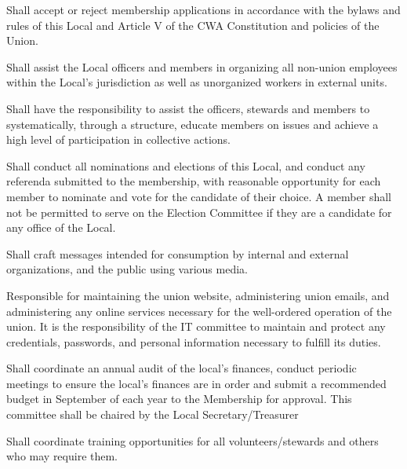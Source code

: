 \documentclass[12pt]{article}
\begin{document}
\begin{description}[labelwidth=\linewidth, listparindent=0pt]
\item[Membership Committee]
Shall accept or reject membership applications in accordance with the bylaws and rules of this Local and Article V of the CWA Constitution and policies of the Union.

\item[Organizing Committee]
Shall assist the Local officers and members in organizing all non-union employees within the Local's jurisdiction as well as unorganized workers in external units.
\item[Mobilization Committee]
Shall have the responsibility to assist the officers, stewards and members to systematically, through a structure, educate members on issues and achieve a high level of participation in collective actions.

\item[Election Committee]
Shall conduct all nominations and elections of this Local, and conduct any referenda submitted to the membership,  with reasonable opportunity for each member to nominate and vote for the candidate of their choice. A member shall not be permitted to serve on the Election Committee if they are a candidate for any office of the Local.

\item[Communications Committee]
  Shall craft messages intended for consumption by internal and external organizations, and the public using various media.

\item[IT Committee]
Responsible for maintaining the union website, administering union emails, and administering any online services necessary for the well-ordered operation of the union. It is the responsibility of the IT committee to maintain and protect any credentials, passwords, and personal information necessary to fulfill its duties.

\item[Finance Committee]

Shall coordinate an annual audit of the local’s finances, conduct periodic meetings to ensure the local’s finances are in order and submit a recommended budget in September of each year to the Membership for approval. This committee shall be chaired by the Local Secretary/Treasurer

\item[Education Committee]
Shall coordinate training opportunities for all volunteers/stewards and others who may require them.


\end{description}
\end{document}
